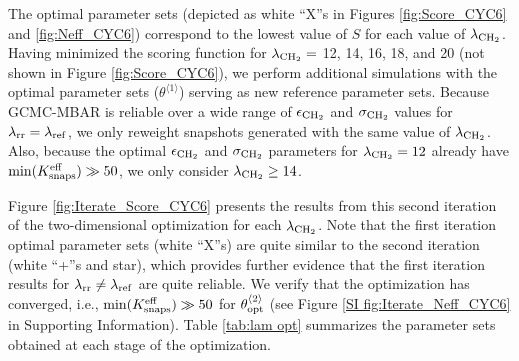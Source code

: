 \documentclass[journal=jced,manuscript=article]{achemso}
\begin{document}
The optimal parameter sets (depicted as white ``X''s in Figures \ref{fig:Score_CYC6} and \ref{fig:Neff_CYC6}) correspond to the lowest value of $S$ for each value of $\lambda_{\rm CH_2}$. Having minimized the scoring function for $\lambda_{\rm CH_2} =$ 12, 14, 16, 18, and 20 (not shown in Figure \ref{fig:Score_CYC6}), we perform additional simulations with the optimal parameter sets ($\theta^{\langle1\rangle}$) serving as new reference parameter sets. Because GCMC-MBAR is reliable over a wide range of $\epsilon_{\rm CH_2}$ and $\sigma_{\rm CH_2}$ values for $\lambda_{\rm rr} = \lambda_{\rm ref}$, we only reweight snapshots generated with the same value of $\lambda_{\rm CH_2}$. Also, because the optimal $\epsilon_{\rm CH_2}$ and $\sigma_{\rm CH_2}$ parameters for $\lambda_{\rm CH_2} = 12$ already have $\min(K_{\rm snaps}^{\rm eff}) \gg 50$, we only consider $\lambda_{\rm CH_2} \ge 14$.


Figure \ref{fig:Iterate_Score_CYC6} presents the results from this second iteration of the two-dimensional optimization for each $\lambda_{\rm CH_2}$. Note that the first iteration optimal parameter sets (white ``X''s) are quite similar to the second iteration (white ``+''s and star), which provides further evidence that the first iteration results for $\lambda_{\rm rr} \neq \lambda_{\rm ref}$ are quite reliable. We verify that the optimization has converged, i.e., $\min(K_{\rm snaps}^{\rm eff}) \gg 50$ for $\theta_{\rm opt}^{\langle2\rangle}$ (see Figure \ref{SI fig:Iterate_Neff_CYC6} in Supporting Information). Table \ref{tab:lam opt} summarizes the parameter sets obtained at each stage of the optimization. 

\end{document}
